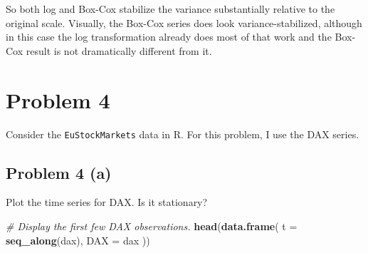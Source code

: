 \documentclass[
  10pt,
]{extarticle}
\newenvironment{Shaded}{\begin{snugshade}}{\end{snugshade}}
\newcommand{\AttributeTok}[1]{\textcolor[rgb]{0.13,0.29,0.53}{#1}}
\newcommand{\CommentTok}[1]{\textcolor[rgb]{0.56,0.35,0.01}{\textit{#1}}}
\newcommand{\FunctionTok}[1]{\textcolor[rgb]{0.13,0.29,0.53}{\textbf{#1}}}
\newcommand{\NormalTok}[1]{#1}
\begin{document}
So both log and Box-Cox stabilize the variance substantially relative to the original scale. Visually, the Box-Cox series does look variance-stabilized, although in this case the log transformation already does most of that work and the Box-Cox result is not dramatically different from it.

\newpage

\section{Problem 4}\label{problem-4}

\begin{problem}[Problem 4]
Consider the \texttt{EuStockMarkets} data in \textsf{R}. For this problem, I use the DAX series.
\end{problem}

\newpage

\subsection{Problem 4 (a)}\label{problem-4-a}

\begin{problem}[Problem 4 (a)]
Plot the time series for DAX. Is it stationary?
\end{problem}

\begin{Shaded}
\begin{Highlighting}[]
\CommentTok{\# Display the first few DAX observations.}
\FunctionTok{head}\NormalTok{(}\FunctionTok{data.frame}\NormalTok{(}
  \AttributeTok{t =} \FunctionTok{seq\_along}\NormalTok{(dax),}
  \AttributeTok{DAX =}\NormalTok{ dax}
\NormalTok{))}
\end{Highlighting}
\end{Shaded}
\end{document}
